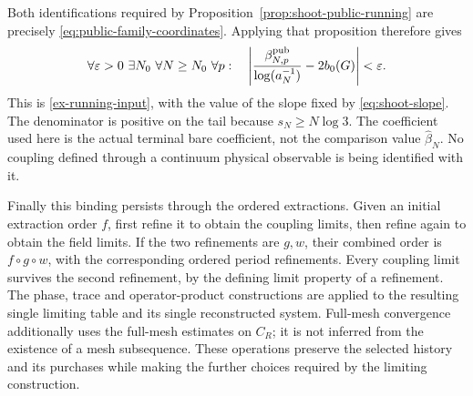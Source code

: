 Both identifications required by
Proposition~\ref{prop:shoot-public-running} are precisely
\eqref{eq:public-family-coordinates}. Applying that proposition therefore gives
\begin{equation}\label{eq:public-family-running}
 \forall\varepsilon>0\ \exists N_0\ \forall N\ge N_0\ \forall p:
 \quad
 \left|\frac{\beta^{\rm pub}_{N,p}}{\log(a_N^{-1})}-2b_0(G)\right|
 <\varepsilon.
\end{equation}
This is \eqref{ex-running-input}, with the value of the slope fixed by
\eqref{eq:shoot-slope}. The denominator is positive on the tail because
$s_N\ge N\log3$. The coefficient used here is the actual terminal bare
coefficient, not the comparison value $\widehat\beta_N$. No coupling defined
through a continuum physical observable is being identified with it.

Finally this binding persists through the ordered extractions. Given
an initial extraction order $f$, first refine it to obtain the coupling
limits, then refine again to obtain the field limits. If the two
refinements are $g,w$, their combined order is
$f\circ g\circ w$, with the corresponding ordered period refinements.
Every coupling limit survives the second refinement, by the defining
limit property of a refinement. The phase, trace and operator-product
constructions are applied to the resulting single limiting table and
its single reconstructed system. Full-mesh convergence additionally
uses the full-mesh estimates on $C_R$; it is not inferred from the
existence of a mesh subsequence. These operations preserve the selected
history and its purchases while making the further choices required
by the limiting construction.
